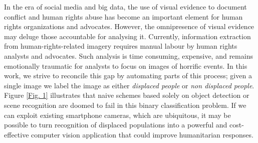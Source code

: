 \documentclass[10pt,twocolumn,letterpaper]{article}
\begin{document}
In the era of social media and big data, the use of visual evidence to document conflict and human rights abuse has become an important element for human rights organizations and advocates. However, the omnipresence of visual evidence
may deluge those accountable for analysing it. Currently, information extraction from human-rights-related imagery requires manual labour by human rights analysts and advocates. Such analysis is time consuming, expensive, and remains emotionally traumatic for analysts to focus on images of horrific events. In this work, we strive to reconcile this gap by automating parts of this process; given a single image we label the image as either \textit{displaced people} or \textit{non displaced people}. Figure \ref{Fig. 1} illustrates that naive schemes based solely on object detection or scene recognition are doomed to
fail in this binary classification problem. If we can exploit existing smartphone cameras, which are ubiquitous, it may be possible to turn recognition of displaced populations into a powerful and cost-effective computer vision application that could improve humanitarian responses. 
\end{document}
